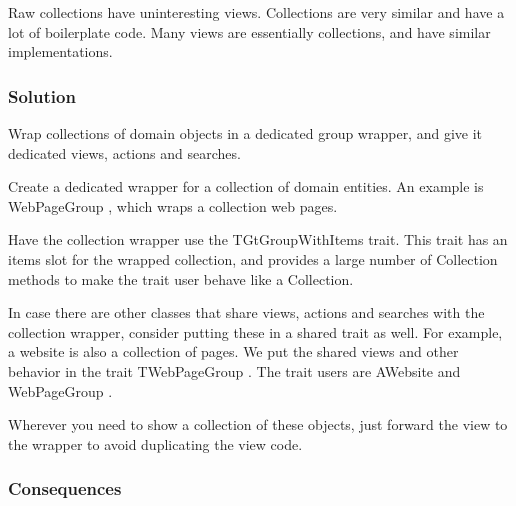 \documentclass[sigconf]{acmart}
\begin{document}
Raw collections have uninteresting views. Collections are very similar and have a lot of boilerplate code. Many views are essentially collections, and have similar implementations.

\subsubsection*{Solution}

Wrap collections of domain objects in a dedicated group wrapper, and give it dedicated views, actions and searches.

Create a dedicated wrapper for a collection of domain entities. An example is WebPageGroup , which wraps a collection web pages.

Have the collection wrapper use the TGtGroupWithItems trait. This trait has an items slot for the wrapped collection, and provides a large number of Collection methods to make the trait user behave like a Collection.

In case there are other classes that share views, actions and searches with the collection wrapper, consider putting these in a shared trait as well. For example, a website is also a collection of pages. We put the shared views and other behavior in the trait TWebPageGroup . The trait users are AWebsite and WebPageGroup .

Wherever you need to show a collection of these objects, just forward the view to the wrapper to avoid duplicating the view code. 



\subsubsection*{Consequences}




\end{document}
